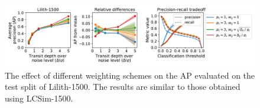 \begin{figure}
    \centering
    \includegraphics[width=0.95\linewidth]{Experiments/Figures/Models/lilith1500_AP_weighting.pdf}
    \caption{The effect of different weighting schemes on the AP evaluated on the test split of Lilith-1500. The results are similar to those obtained using LCSim-1500.}
    \label{fig:lilith_weighting}
\end{figure}

